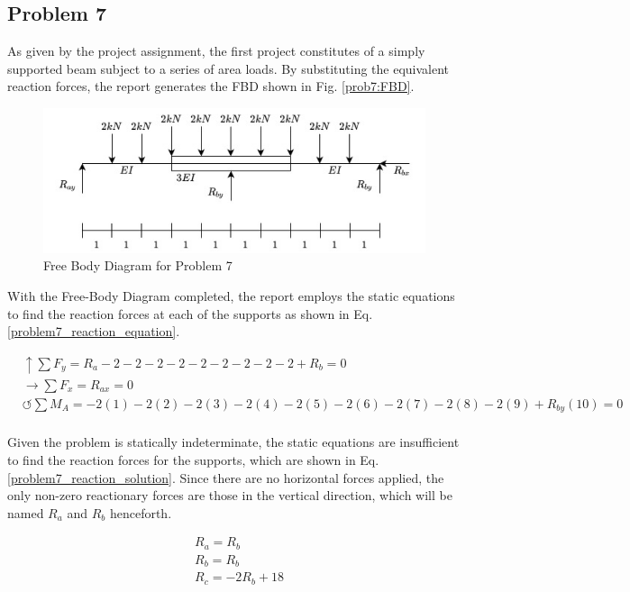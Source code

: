 \documentclass[a4paper]{article}
\begin{document}
\subsection{Problem 7}

As given by the project assignment, the first project constitutes of a simply supported beam subject to a series of area loads. By substituting the equivalent reaction forces, the report generates the FBD shown in Fig. \ref{prob7:FBD}.

\begin{figure}[h]
\includegraphics[width=\textwidth]{FBD/FBD_7.jpg}
\caption{Free Body Diagram for Problem 7}
\label{FBD_7}
\end{figure}

With the Free-Body Diagram completed, the report employs the static equations to find the reaction forces at each of the supports as shown in Eq. \ref{problem7_reaction_equation}.

\begin{equation}
\begin{split}
	&\uparrow \sum F_y = R_a - 2 -2 -2 -2 -2 -2 -2 -2 -2 + R_b = 0 \\
 	&\rightarrow \sum F_x = R_{ax} = 0 \\
 	&\circlearrowleft \sum M_A = -2(1) - 2(2) -2(3) - 2(4) -2(5) - 2(6) - 2(7) - 2(8) -2(9) + R_{by}(10) = 0 \\
\end{split}
\label{problem7_reaction_equation}
\end{equation}

Given the problem is statically indeterminate, the static equations are insufficient to find the reaction forces for the supports, which are shown in Eq. \ref{problem7_reaction_solution}. Since there are no horizontal forces applied, the only non-zero reactionary forces are those in the vertical direction, which will be named $R_a$ and $R_b$ henceforth.

\begin{equation}
\begin{split}
	& R_a = R_b\\
    	& R_b = R_b \\
    	& R_c = -2R_b + 18 \\
\end{split}
\label{problem7_reaction_solution}
\end{equation}
\end{document}
